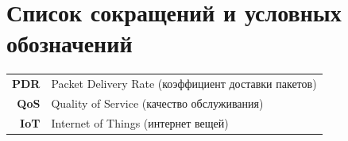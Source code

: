 \chapter*{Список сокращений и условных обозначений}
\noindent
\addtocounter{table}{-1}

\begin{longtable}{@{}>{\bfseries}rl@{}}
	PDR         & Packet Delivery Rate (коэффициент доставки пакетов) \\
	QoS         & Quality of Service (качество обслуживания) \\
	IoT         & Internet of Things (интернет вещей) \\
	
\end{longtable}
